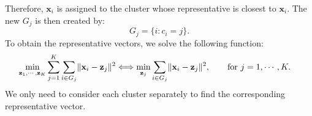 \documentclass{huhtakm-template-book-v2}
\begin{document}
    Therefore, $\mathbf{x}_{i}$ is assigned to the cluster whose representative is closest to $\mathbf{x}_{i}$. The new $G_{j}$ is then created by:
    \begin{equation*}
        G_{j} = \{i : c_{i} = j\}.
    \end{equation*}
    To obtain the representative vectors, we solve the following function:
    \begin{align*}
        \min_{\mathbf{z}_{1}, \cdots, \mathbf{z}_{K}}\sum_{j=1}^{K}\sum_{i \in G_{j}}\lVert{\mathbf{x}_{i} - \mathbf{z}_{j}}\rVert^{2} &\Longleftrightarrow \min_{\mathbf{z}_{j}}\sum_{i \in G_{j}}\lVert{\mathbf{x}_{i} - \mathbf{z}_{j}}\rVert^{2}, \qquad \text{for } j = 1, \cdots, K.
    \end{align*}
    We only need to consider each cluster separately to find the corresponding representative vector.
\end{document}
